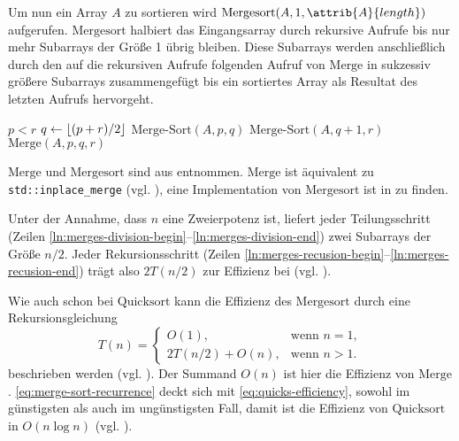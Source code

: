 Um nun ein Array $A$ zu sortieren wird $\text{Mergesort}(A, 1, \attrib{A}{length})$ aufgerufen. $\text{Mergesort}$ halbiert das Eingangsarray durch rekursive Aufrufe bis nur mehr Subarrays der Größe 1 übrig bleiben. Diese Subarrays werden anschließlich durch den auf die rekursiven Aufrufe folgenden Aufruf von $\text{Merge}$ in sukzessiv größere Subarrays zusammengefügt bis ein sortiertes Array als Resultat des letzten Aufrufs hervorgeht.

\begin{codebox}
    \li \If $p < r$
    \li     \Do
                $q \gets \left\lfloor (p + r) / 2 \right\rfloor$\label{ln:merges-division-begin}
    \li         $\text{Merge-Sort}(A, p, q)$\label{ln:merges-recusion-begin}
    \li         $\text{Merge-Sort}(A, q + 1, r)$\label{ln:merges-division-end}\label{ln:merges-recusion-end}
    \li         $\text{Merge}(A, p, q, r)$
            \End
\end{codebox}

$\text{Merge}$ und $\text{Mergesort}$ sind aus \cite[33f]{clrs2001} entnommen. $\text{Merge}$ ist äquivalent zu \lstinline{std::inplace_merge} (vgl. \cite[929]{ISO-C++17}), eine Implementation von $\text{Mergesort}$ ist in  zu finden.

Unter der Annahme, dass $n$ eine Zweierpotenz ist, liefert jeder Teilungsschritt (Zeilen \ref{ln:merges-division-begin}--\ref{ln:merges-division-end}) zwei Subarrays der Größe $n / 2$. Jeder Rekursionsschritt (Zeilen \ref{ln:merges-recusion-begin}--\ref{ln:merges-recusion-end}) trägt also $2T(n / 2)$ zur Effizienz bei (vgl. \cite[36]{clrs2001}).

Wie auch schon bei $\text{Quicksort}$ kann die Effizienz des $\text{Mergesort}$ durch eine Rekursionsgleichung
\begin{equation}\label{eq:merge-sort-recurrence}
    T(n) = \begin{cases}
        O(1), & \text{wenn $n = 1$},\\
        2T(n/2) + O(n), & \text{wenn $n > 1$}.
    \end{cases}
\end{equation}
beschrieben werden (vgl. \cite[36]{clrs2001}). Der Summand $O(n)$ ist hier die Effizienz von $\text{Merge}$. \eqref{eq:merge-sort-recurrence} deckt sich mit \eqref{eq:quicks-efficiency}, sowohl im günstigsten als auch im ungünstigsten Fall, damit ist die Effizienz von $\text{Quicksort}$ in $O(n \log n)$ (vgl. \cite[36]{clrs2001}).
